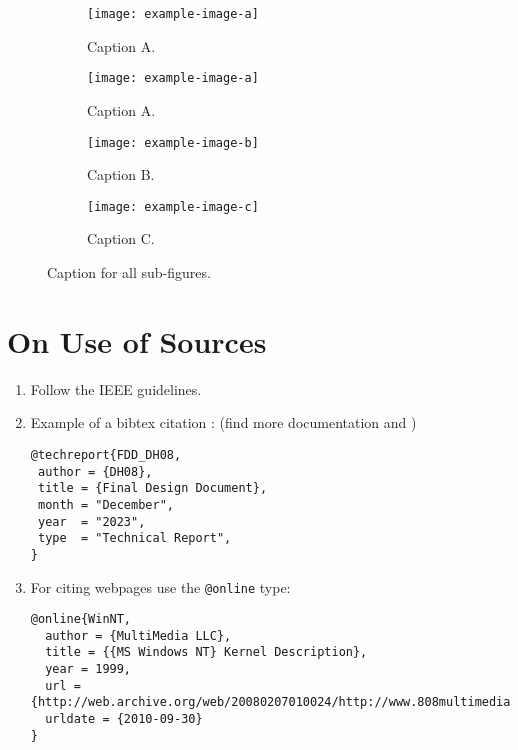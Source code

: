 \begin{figure}[h]
    \centering
    \begin{subfigure}{0.3\textwidth} %
    \centering
    \texttt{[image: example-image-a]} %
    \caption{Caption A.}            %
    \label{subfig:subfig-example-a} %
    \end{subfigure}

    \begin{subfigure}{0.2\textwidth}
    \centering
    \texttt{[image: example-image-a]}
    \caption{Caption A.}
    \label{subfig:subfig-example-a-repeated}
    \end{subfigure}
    \hfill %
    \begin{subfigure}{0.2\textwidth}
    \centering
    \texttt{[image: example-image-b]}
    \caption{Caption B.}
    \label{subfig:subfig-example-b}
    \end{subfigure}
    \hfill 
    \begin{subfigure}{0.2\textwidth}
    \centering
    \texttt{[image: example-image-c]}
    \caption{Caption C.}
    \label{subfig:subfig-example-c}
    \end{subfigure}

    \caption{Caption for all sub-figures.}  %
    \label{fig:subfig-example}              %
\end{figure}
\section*{On Use of Sources}
\begin{enumerate}[label=SO.\arabic*]
    \item Follow the IEEE guidelines.
    \item Example of a bibtex citation \cite{WinNT}: (find more documentation \href{https://bibtex.eu/types/}{} and \href{https://www.overleaf.com/learn/latex/Bibliography_management_with_bibtex}{})

\begin{verbatim}
@techreport{FDD_DH08, 
 author = {DH08}, 
 title = {Final Design Document}, 
 month = "December", 
 year  = "2023", 
 type  = "Technical Report", 
}
\end{verbatim}
    \item For citing webpages use the \verb|@online| type:
    \begin{verbatim}
@online{WinNT,
  author = {MultiMedia LLC},
  title = {{MS Windows NT} Kernel Description},
  year = 1999,
  url = {http://web.archive.org/web/20080207010024/http://www.808multimedia.com/winnt/kernel.htm},
  urldate = {2010-09-30}
}
\end{verbatim}
\end{enumerate}
